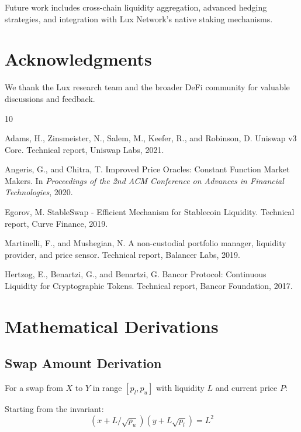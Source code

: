 \documentclass[11pt,a4paper]{article}
\begin{document}
Future work includes cross-chain liquidity aggregation, advanced hedging strategies, and integration with Lux Network's native staking mechanisms.

\section*{Acknowledgments}

We thank the Lux research team and the broader DeFi community for valuable discussions and feedback.


\begin{thebibliography}{10}

Adams, H., Zinsmeister, N., Salem, M., Keefer, R., and Robinson, D.
\newblock Uniswap v3 Core.
\newblock Technical report, Uniswap Labs, 2021.

Angeris, G., and Chitra, T.
\newblock Improved Price Oracles: Constant Function Market Makers.
\newblock In \emph{Proceedings of the 2nd ACM Conference on Advances in Financial Technologies}, 2020.

Egorov, M.
\newblock StableSwap - Efficient Mechanism for Stablecoin Liquidity.
\newblock Technical report, Curve Finance, 2019.

Martinelli, F., and Mushegian, N.
\newblock A non-custodial portfolio manager, liquidity provider, and price sensor.
\newblock Technical report, Balancer Labs, 2019.

Hertzog, E., Benartzi, G., and Benartzi, G.
\newblock Bancor Protocol: Continuous Liquidity for Cryptographic Tokens.
\newblock Technical report, Bancor Foundation, 2017.

\end{thebibliography}

\appendix

\section{Mathematical Derivations}

\subsection{Swap Amount Derivation}

For a swap from $X$ to $Y$ in range $[p_l, p_u]$ with liquidity $L$ and current price $P$:

Starting from the invariant:
\begin{equation}
    (x + L/\sqrt{p_u})(y + L\sqrt{p_l}) = L^2
\end{equation}
\end{document}

